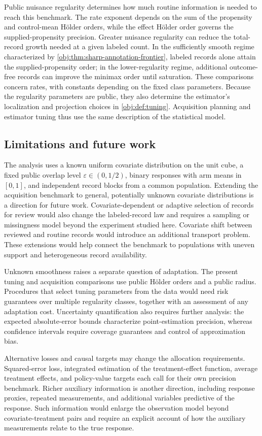 Public nuisance regularity determines how much routine information is needed to reach this benchmark. The rate exponent depends on the sum of the propensity and control-mean H\"older orders, while the effect H\"older order governs the supplied-propensity precision. Greater nuisance regularity can reduce the total-record growth needed at a given labeled count. In the sufficiently smooth regime characterized by \cref{obj:thm:sharp-annotation-frontier}, labeled records alone attain the supplied-propensity order; in the lower-regularity regime, additional outcome-free records can improve the minimax order until saturation. These comparisons concern rates, with constants depending on the fixed class parameters. Because the regularity parameters are public, they also determine the estimator's localization and projection choices in \cref{obj:def:tuning}. Acquisition planning and estimator tuning thus use the same description of the statistical model.

\subsection{Limitations and future work}

The analysis uses a known uniform covariate distribution on the unit cube, a fixed public overlap level \(\varepsilon\in(0,1/2)\), binary responses with arm means in \([0,1]\), and independent record blocks from a common population. Extending the acquisition benchmark to general, potentially unknown covariate distributions is a direction for future work. Covariate-dependent or adaptive selection of records for review would also change the labeled-record law and requires a sampling or missingness model beyond the experiment studied here. Covariate shift between reviewed and routine records would introduce an additional transport problem. These extensions would help connect the benchmark to populations with uneven support and heterogeneous record availability.

Unknown smoothness raises a separate question of adaptation. The present tuning and acquisition comparisons use public H\"older orders and a public radius. Procedures that select tuning parameters from the data would need risk guarantees over multiple regularity classes, together with an assessment of any adaptation cost. Uncertainty quantification also requires further analysis: the expected absolute-error bounds characterize point-estimation precision, whereas confidence intervals require coverage guarantees and control of approximation bias.

Alternative losses and causal targets may change the allocation requirements. Squared-error loss, integrated estimation of the treatment-effect function, average treatment effects, and policy-value targets each call for their own precision benchmark. Richer auxiliary information is another direction, including response proxies, repeated measurements, and additional variables predictive of the response. Such information would enlarge the observation model beyond covariate-treatment pairs and require an explicit account of how the auxiliary measurements relate to the true response.
